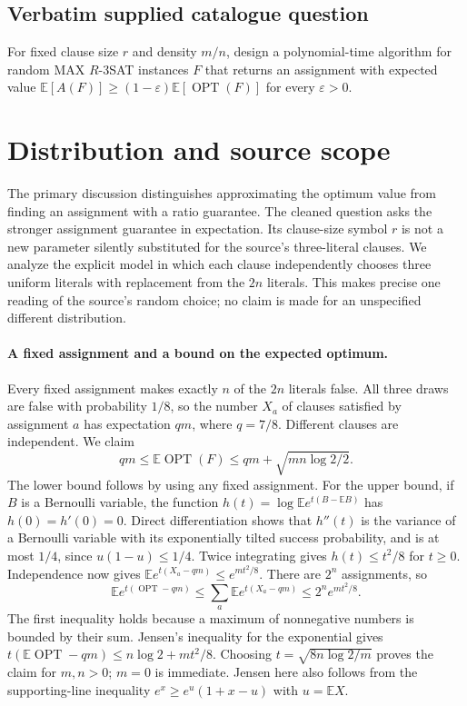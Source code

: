 \documentclass[11pt]{article}
\begin{document}
\subsection{Verbatim supplied catalogue question}
For fixed clause size $r$ and density $m/n$, design a polynomial-time algorithm for random MAX $R$-3SAT instances $F$ that returns an assignment with expected value $\mathbb{E}[A(F)]\geq(1-\varepsilon)\mathbb{E}[\operatorname{OPT}(F)]$ for every $\varepsilon>0$.

\section{Distribution and source scope}
The primary discussion distinguishes approximating the optimum value
from finding an assignment with a ratio guarantee. The cleaned question
asks the stronger assignment guarantee in expectation. Its clause-size
symbol $r$ is not a new parameter silently substituted for the source's
three-literal clauses. We analyze the explicit model in which each
clause independently chooses three uniform literals with replacement
from the $2n$ literals. This makes precise one reading of the source's
random choice; no claim is made for an unspecified different distribution.

\paragraph{A fixed assignment and a bound on the expected optimum.}
Every fixed assignment makes exactly $n$ of the $2n$ literals false.
All three draws are false with probability $1/8$, so the number
$X_a$ of clauses satisfied by assignment $a$ has expectation
$qm$, where $q=7/8$. Different clauses are independent. We claim
\[
qm\le\mathbb E\operatorname{OPT}(F)
\le qm+\sqrt{mn\log2/2}.
\]
The lower bound follows by using any fixed assignment.
For the upper bound, if $B$ is a Bernoulli variable, the function
$h(t)=\log\mathbb E e^{t(B-\mathbb EB)}$ has $h(0)=h'(0)=0$.
Direct differentiation shows that $h''(t)$ is the variance of a
Bernoulli variable with its exponentially tilted success probability,
and is at most $1/4$, since $u(1-u)\le1/4$. Twice integrating
gives $h(t)\le t^2/8$ for $t\ge0$. Independence now gives
$\mathbb E e^{t(X_a-qm)}\le e^{mt^2/8}$. There are $2^n$
assignments, so
\[
\mathbb E e^{t(\operatorname{OPT}-qm)}
\le\sum_a\mathbb E e^{t(X_a-qm)}\le2^n e^{mt^2/8}.
\]
The first inequality holds because a maximum of nonnegative numbers
is bounded by their sum. Jensen's inequality for the exponential
gives $t(\mathbb E\operatorname{OPT}-qm)\le n\log2+mt^2/8$.
Choosing $t=\sqrt{8n\log2/m}$ proves the claim for $m,n>0$;
$m=0$ is immediate. Jensen here also follows from the supporting-line
inequality $e^x\ge e^u(1+x-u)$ with $u=\mathbb EX$.
\end{document}
